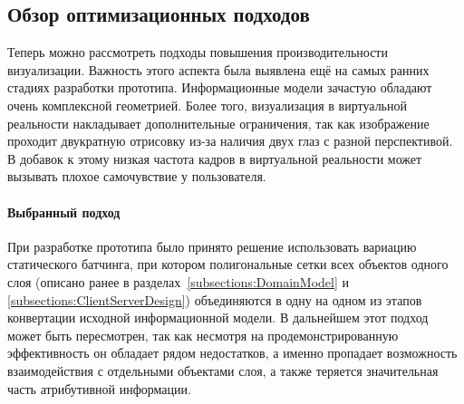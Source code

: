 ﻿\subsection{Обзор оптимизационных подходов}
\label{subsections:Optimization}

Теперь можно рассмотреть подходы повышения производительности визуализации.
Важность этого аспекта была выявлена 
ещё на самых ранних стадиях разработки прототипа.
Информационные модели зачастую обладают очень комплексной геометрией.
Более того, визуализация в виртуальной реальности накладывает
дополнительные ограничения, так как изображение проходит двукратную отрисовку
из-за наличия двух глаз с разной перспективой.
В добавок к этому низкая частота кадров в виртуальной реальности
может вызывать плохое самочувствие у пользователя.%
\cite{Weech2019}




\paragraph{Выбранный подход}

При разработке прототипа было принято решение
использовать вариацию статического батчинга,
при котором полигональные сетки всех объектов одного слоя
(описано ранее в разделах~\ref{subsections:DomainModel}
и \ref{subsections:ClientServerDesign})
объединяются в одну на одном из этапов конвертации
исходной информационной модели.
В дальнейшем этот подход может быть пересмотрен,
так как несмотря на продемонстрированную эффективность
он обладает рядом недостатков,
а именно пропадает возможность взаимодействия с
отдельными объектами слоя, а также
теряется значительная часть атрибутивной информации.
